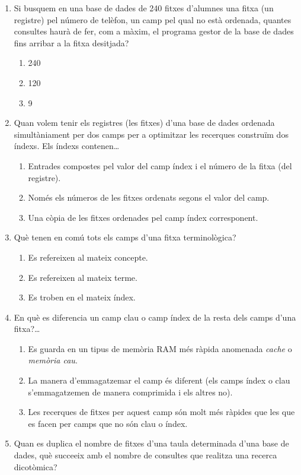 \begin{enumerate}
\item 
    Si busquem en una base de dades de 240 fitxes d'alumnes una fitxa
    (un registre) pel número de telèfon, un camp pel qual no està
    ordenada, quantes consultes haurà de fer, com a màxim, el programa
    gestor de la base de dades fins arribar a la fitxa desitjada?
   
\begin{enumerate}
\item 240
\item 120
\item 9
\end{enumerate}
\item 
   Quan volem tenir els registres (les fitxes) d'una base de dades
 ordenada simultàniament per dos camps per a optimitzar les recerques
 construïm dos índexs. Els índexs contenen{\ldots}
   
\begin{enumerate}
\item Entrades compostes pel valor del camp índex i el número
     de la fitxa (del registre).
\item Només els números de les fitxes ordenats segons el valor del
     camp.
\item Una còpia de les fitxes ordenades pel camp índex
     corresponent.
\end{enumerate}

\item Què tenen en comú tots els camps d'una fitxa terminològica?
   
\begin{enumerate}
\item Es refereixen al mateix concepte.
\item Es refereixen al mateix terme.
\item Es troben en el mateix índex.
\end{enumerate}
\item En què es diferencia un camp clau o camp índex de la resta
   dels camps d'una fitxa?{\ldots}
   
\begin{enumerate}
\item Es guarda en un tipus de memòria RAM més ràpida anomenada
      \emph{cache} o \emph{memòria cau}.
\item La manera d'emmagatzemar el camp és diferent (els camps índex o clau
      s'emmagatzemen de manera comprimida i els altres no).
\item Les recerques de fitxes per aquest camp són
      molt més ràpides que les que es facen per camps que no són clau
      o índex.
\end{enumerate}
\item Quan es duplica el nombre de fitxes d'una taula determinada
   d'una base de dades, què succeeix amb el nombre de consultes que
   realitza una recerca dicotòmica?
   

\end{enumerate}
